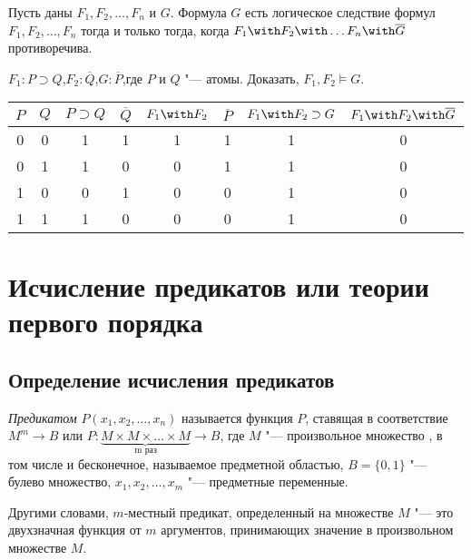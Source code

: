 \begin{theorem} Пусть даны $F_1,F_2,\ldots,F_n$ и $G$. Формула $G$
есть логическое следствие формул $F_1,F_2,\ldots,F_n$ тогда и только
тогда, когда $F_1 \with F_2 \with\ldots F_n \with \overline{G}$
противоречива.
\end{theorem}

\begin{ex} $F_1\colon P \supset Q$,\quad $F_2\colon
\overline{Q}$,\quad $G\colon \overline{P}$,\quad где $P$ и $Q$ "---
атомы. Доказать, $F_1,F_2 \models G$.
  \begin{center}
    \begin{tabular}{c|c||c|c|c|c|c|c|} $P$ & $Q$ & $P \supset Q$ &
$\overline{Q}$ & $F_1 \with F_2$ & $\overline{P}$ & $F_1 \with F_2
\supset G$ & $F_1 \with F_2 \with \overline{G}$\\ \hline\hline 0 & 0 &
1 & 1 & 1 & 1 & 1 & 0\\ \hline 0 & 1 & 1 & 0 & 0 & 1 & 1 & 0\\ \hline
1 & 0 & 0 & 1 & 0 & 0 & 1 & 0\\ \hline 1 & 1 & 1 & 0 & 0 & 0 & 1 & 0\\
\hline
    \end{tabular}
  \end{center}
\end{ex}

\section{Исчисление предикатов или теории первого порядка}

\subsection{Определение исчисления предикатов}

\emph{Предикатом} $P(x_1,x_2,\ldots,x_n)$ называется функция $P$,
ставящая в соответствие $M^m\rightarrow B$ или $P\colon \underbrace{M
\times M \times\ldots\times M}_{\text{m раз}} \rightarrow B$, где
$M$ "--- произвольное множество , в том числе и бесконечное, называемое
предметной областью, $B = \{0,1\}$ "--- булево множество,
$x_1,x_2,\ldots,x_m$ "--- предметные переменные.

Другими словами, $m$-местный предикат, определенный на множестве
$M$ "--- это двухзначная функция от $m$ аргументов, принимающих
значение в произвольном множестве $M$.

